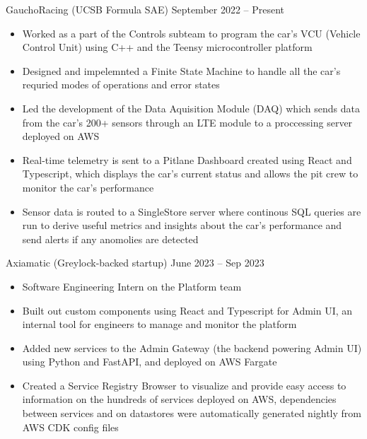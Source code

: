 \documentclass[9pt]{developercv} %
\begin{document}
\vspace{-14 pt}
\begin{entrylist}
    \entry
		{}
		{GauchoRacing (UCSB Formula SAE)}
		{September 2022 – Present}
		{\vspace{-10pt}
        \begin{itemize}[noitemsep,topsep=0pt,parsep=0pt,partopsep=0pt, leftmargin=10pt]
            \item Worked as a part of the Controls subteam to program the car's VCU (Vehicle Control Unit) using C++ and the Teensy microcontroller platform
            \item Designed and impelemnted a Finite State Machine to handle all the car's requried modes of operations and error states
            \item Led the development of the Data Aquisition Module (DAQ) which sends data from the car's 200+ sensors through an LTE module to a proccessing server deployed on AWS
            \item Real-time telemetry is sent to a Pitlane Dashboard created using React and Typescript, which displays the car's current status and allows the pit crew to monitor the car's performance
            \item Sensor data is routed to a SingleStore server where continous SQL queries are run to derive useful metrics and insights about the car's performance and send alerts if any anomolies are detected
        \end{itemize}}
	\entry
        {}
		{Axiamatic (Greylock-backed startup)}
		{June 2023 – Sep 2023}
		{\vspace{-10pt}
        \begin{itemize}[noitemsep,topsep=0pt,parsep=0pt,partopsep=0pt, leftmargin=10pt]
            \item Software Engineering Intern on the Platform team
            \item Built out custom components using React and Typescript for Admin UI, an internal tool for engineers to manage and monitor the platform
            \item Added new services to the Admin Gateway (the backend powering Admin UI) using Python and FastAPI, and deployed on AWS Fargate
            \item Created a Service Registry Browser to visualize and provide easy access to information on the hundreds of services deployed on AWS, dependencies between services and on datastores were automatically generated nightly from AWS CDK config files

\end{itemize}}
\end{entrylist}
\end{document}

